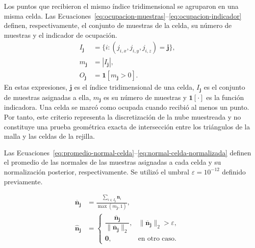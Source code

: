 Los puntos que recibieron el mismo índice tridimensional se agruparon en una misma celda. Las Ecuaciones~\eqref{eq:ocupacion-muestras}--\eqref{eq:ocupacion-indicador} definen, respectivamente, el conjunto de muestras de la celda, su número de muestras y el indicador de ocupación.
\begin{subequations}\label{eq:ocupacion}
\begin{align}
I_{\mathbf j}&=\{i:(j_{i,x},j_{i,y},j_{i,z})=\mathbf j\}, \label{eq:ocupacion-muestras} \\
m_{\mathbf j}&=|I_{\mathbf j}|, \label{eq:ocupacion-conteo} \\
O_{\mathbf j}&=\mathbf1[m_{\mathbf j}>0]. \label{eq:ocupacion-indicador}
\end{align}
\end{subequations}
En estas expresiones, $\mathbf j$ es el índice tridimensional de una celda, $I_{\mathbf j}$ es el conjunto de muestras asignadas a ella, $m_{\mathbf j}$ es su número de muestras y $\mathbf 1[\cdot]$ es la función indicadora. Una celda se marcó como ocupada cuando recibió al menos un punto. Por tanto, este criterio representa la discretización de la nube muestreada y no constituye una prueba geométrica exacta de intersección entre los triángulos de la malla y las celdas de la rejilla.

Las Ecuaciones~\eqref{eq:promedio-normal-celda}--\eqref{eq:normal-celda-normalizada} definen el promedio de las normales de las muestras asignadas a cada celda y su normalización posterior, respectivamente. Se utilizó el umbral $\varepsilon=10^{-12}$ definido previamente.

\begin{subequations}\label{eq:normalcelda}
\begin{align}
\overline{\mathbf n}_{\mathbf j}
&=
\frac{
\displaystyle\sum_{i\in I_{\mathbf j}}\mathbf n_i
}{
\max(m_{\mathbf j},1)
},
\label{eq:promedio-normal-celda}\\
\widehat{\mathbf n}_{\mathbf j}
&=
\begin{cases}
\dfrac{\overline{\mathbf n}_{\mathbf j}}
{\|\overline{\mathbf n}_{\mathbf j}\|_2},
&
\|\overline{\mathbf n}_{\mathbf j}\|_2>\varepsilon,\\[2mm]
\mathbf 0,
&
\text{en otro caso}.
\end{cases}
\label{eq:normal-celda-normalizada}
\end{align}
\end{subequations}

